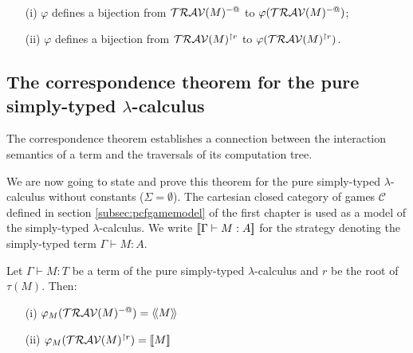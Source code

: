 \begin{cor} \
\label{cor:varphi_bij}
\begin{itemize}
\item[(i)] $\varphi$ defines a bijection from $\mathcal{TRAV}(M)^{-@}$
to $\varphi(\mathcal{TRAV}(M)^{-@})$;
\item[(ii)] $\varphi$ defines a bijection from $\mathcal{TRAV}(M)^{\upharpoonright r}$ to
$\varphi(\mathcal{TRAV}(M)^{\upharpoonright r})$.
\end{itemize}
\end{cor}

\subsection{The correspondence theorem for the pure simply-typed $\lambda$-calculus}
The correspondence theorem establishes a connection between
the interaction semantics of a term and the traversals of its computation tree.

We are now going to state and prove this theorem for the pure simply-typed $\lambda$-calculus without constants ($\Sigma = \emptyset$).
The cartesian closed category of games $\mathcal{C}$ defined in section \ref{subsec:pcfgamemodel} of the first chapter is used as a
model of the simply-typed $\lambda$-calculus. We write ${[\![ \Gamma \vdash M : A ]\!]}$ for the strategy denoting the simply-typed term
$\Gamma \vdash M : A$.

\begin{prop}
\label{prop:rel_gamesem_trav} Let $\Gamma \vdash M : T$ be a
term of the pure simply-typed $\lambda$-calculus and $r$ be the root
of $\tau(M)$. Then:
\begin{itemize}
\item[(i)]  $\varphi_M(\mathcal{TRAV}(M)^{-@}) = {\langle\!\langle M \rangle\!\rangle}$
\item[(ii)] $\varphi_M(\mathcal{TRAV}(M)^{\upharpoonright r}) = {[\![ M ]\!]}$
\end{itemize}
\end{prop}


